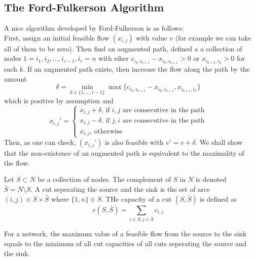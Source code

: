 \subsection{The Ford-Fulkerson Algorithm}
A nice algorithm developed by Ford-Fulkerson is as follows:\\
First, assign an initial feasible flow $(x_{i,j})$ with value $v$ (for example we can take all of them to be zero).
Then find an augmented path, defined a a collection of nodes $1=i_1,i_2,\ldots,i_{r-1},i_r=n$ with eiher $c_{i_k,i_{k+1}}-x_{i_k,i_{k+1}}>0$ or $x_{i_{k+1},i_k}>0$ for each $k$.
If an augmented path exists, then increase the flow along the path by the amount
$$\delta=\min_{k\in\{1,\ldots,r-1\}}\max\{c_{i_k,i_{k+1}}-x_{i_k,i_{k+1}},x_{i_{k+1},i_k}\}$$
which is positive by assumption and
$$x_{i,j}'=\begin{cases}
    x_{i,j}+\delta\text{, if $i,j$ are consecutive in the path}\\
    x_{i,j}-\delta\text{, if $j,i$ are consecutive in the path}\\
    x_{i,j}\text{, otherwise}
\end{cases}$$
Then, as one can check, $(x_{i,j}')$ is also feasible with $v'=v+\delta$.
We shall show that the non-existence of an augmented path is equivalent to the maximality of the flow.
\begin{definition}
    Let $S\subset N$ be a collection of nodes.
    The complement of $S$ in $N$ is denoted $\bar{S}=N\setminus S$.
    A cut seperating the source and the sink is the set of arcs $(i,j)\in S\times \bar{S}$ where $\{1,n\}\in S$.
    THe capacity of a cut $(S,\bar{S})$ is defined as
    $$c(S,\bar{S})=\sum_{i\in S,j\in\bar{S}}c_{i,j}$$
\end{definition}
\begin{theorem}\label{max-flow-min-cut}
    For a network, the maximum value of a feasible flow from the source to the sink equals to the minimum of all cut capacities of all cuts seperating the source and the sink.
\end{theorem}
